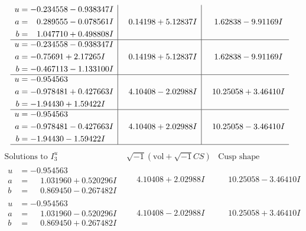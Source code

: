 \documentclass[1p]{elsarticle_modified}
\theoremstyle{definition}
\newcommand{\I}{\sqrt{-1}}
\begin{document}
$$\begin{array}{c|c|c}
\begin{aligned}
u &= -0.234558 - 0.938347 I \\
a &= \phantom{-}0.289555 - 0.078561 I \\
b &= \phantom{-}1.047710 + 0.498808 I\end{aligned}
 & \phantom{-}0.14198 + 5.12837 I & \phantom{-}1.62838 - 9.91169 I \\ \hline\begin{aligned}
u &= -0.234558 - 0.938347 I \\
a &= -0.75691 + 2.17265 I \\
b &= -0.467113 - 1.133100 I\end{aligned}
 & \phantom{-}0.14198 + 5.12837 I & \phantom{-}1.62838 - 9.91169 I \\ \hline\begin{aligned}
u &= -0.954563\phantom{ +0.000000I} \\
a &= -0.978481 + 0.427663 I \\
b &= -1.94430 + 1.59422 I\end{aligned}
 & \phantom{-}4.10408 - 2.02988 I & \phantom{-}10.25058 + 3.46410 I \\ \hline\begin{aligned}
u &= -0.954563\phantom{ +0.000000I} \\
a &= -0.978481 - 0.427663 I \\
b &= -1.94430 - 1.59422 I\end{aligned}
 & \phantom{-}4.10408 + 2.02988 I & \phantom{-}10.25058 - 3.46410 I\\
 \hline 
 \end{array}$$\newpage$$\begin{array}{c|c|c}  
\text{Solutions to }I^u_{3}& \I (\text{vol} + \sqrt{-1}CS) & \text{Cusp shape}\\
 \hline 
\begin{aligned}
u &= -0.954563\phantom{ +0.000000I} \\
a &= \phantom{-}1.031960 + 0.520296 I \\
b &= \phantom{-}0.869450 - 0.267482 I\end{aligned}
 & \phantom{-}4.10408 + 2.02988 I & \phantom{-}10.25058 - 3.46410 I \\ \hline\begin{aligned}
u &= -0.954563\phantom{ +0.000000I} \\
a &= \phantom{-}1.031960 - 0.520296 I \\
b &= \phantom{-}0.869450 + 0.267482 I\end{aligned}
 & \phantom{-}4.10408 - 2.02988 I & \phantom{-}10.25058 + 3.46410 I \\ \hline\begin{aligned}

\end{aligned}
\end{array}$$
\end{document}
